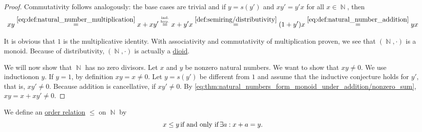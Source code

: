 \begin{proof}
   Commutativity follows analogously: the base cases are trivial and if \( y = s(y') \) and \( xy' = y'x \) for all \( x \in \BbbN \), then
  \begin{equation*}
    xy
    \overset{\eqref{eq:def:natural_number_multiplication}} =
    x + xy'
    \overset {\substack{\text{\tiny ind.} \\ \text{\tiny hyp.}}} =
    x + y'x
    \overset{\eqref{def:semiring/distributivity}} =
    (1 + y') x
    \overset{\eqref{eq:def:natural_number_addition}} =
    yx
  \end{equation*}

   It is obvious that \( 1 \) is the multiplicative identity. With associativity and commutativity of multiplication proven, we see that \( (\BbbN, \cdot) \) is a monoid. Because of distributivity, \( (\BbbN, \cdot) \) is actually a \hyperref[def:semiring/dioid]{dioid}.

  We will now show that \( \BbbN \) has no zero divisors. Let \( x \) and \( y \) be nonzero natural numbers. We want to show that \( xy \neq 0 \). We use induction\IND on \( y \). If \( y = 1 \), by definition \( xy = x \neq 0 \). Let \( y = s(y') \) be different from \( 1 \) and assume that the inductive conjecture holds for \( y' \), that is, \( xy' \neq 0 \). Because addition is cancellative, if \( xy' \neq 0 \). By \eqref{eq:thm:natural_numbers_form_monoid_under_addition/nonzero_sum}, \( xy = x + xy' \neq 0 \).
\end{proof}

\begin{definition}\label{def:natural_number_ordering}
  We define an \hyperref[def:preordered_set]{order relation} \( \leq \) on \( \BbbN \) by
  \begin{equation*}
    x \leq y \mathop{\text{if and only if}} \exists a: x + a = y.
  \end{equation*}
\end{definition}

